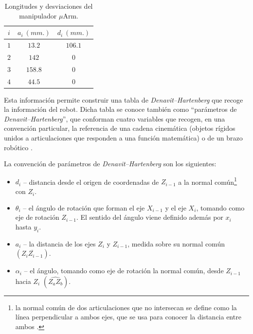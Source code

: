 \begin{table}[ht]
\begin{minipage}{.49\linewidth}
\begin{tabular}{|| c | c c ||}
            $i$ & $a_i~(mm.)$ & $d_i~(mm.)$ \\ [0.5ex]
            \hline\hline
            $1$ & $13.2$      & $106.1$     \\
            \hline
            $2$ & $142$       & $0$         \\
            \hline
            $3$ & $158.8$     & $0$         \\
            \hline
            $4$ & $44.5$      & $0$         \\ [1ex]
            \hline
        \end{tabular}
        \caption{Longitudes y desviaciones del manipulador $\mu$Arm.}
        \label{tab:uArm-ld-values}
    \end{minipage}
\end{table}

Esta información permite construir una tabla de \textit{Denavit--Hartenberg} que
recoge la información del robot. Dicha tabla se conoce también como ``parámetros de
\textit{Denavit--Hartenberg}'', que conforman cuatro variables que recogen, en una
convención particular, la referencia de una cadena cinemática (objetos rígidos unidos
a articulaciones que responden a una función matemática) o de un brazo robótico \cite{DenavitHartenbergParameters2020}.

La convención de parámetros de \textit{Denavit--Hartenberg} son los siguientes:
\begin{itemize}
    \item $d_i$ -- distancia desde el origen de coordenadas de $Z_{i - 1}$ a la normal común\footnote{la normal
              común de dos articulaciones que no intersecan se define como la línea perpendicular a
              ambos ejes, que se usa para conocer la distancia entre ambos \cite{CommonNormalRobotics2017}.}
          con $Z_i$.
    \item $\theta_i$ -- el ángulo de rotación que forman el eje $X_{i - 1}$ y el eje $X_i$,
                    tomando como eje de rotación $Z_{i - 1}$. El sentido del ángulo viene definido además
                    por $x_i$ hasta $y_i$.
    \item $a_i$ -- la distancia de los ejes $Z_i$ y $Z_{i - 1}$, medida sobre su normal común $\left(\overline{Z_iZ_{i-1}}\right)$.
    \item $\alpha_i$ -- el ángulo, tomando como eje de rotación la normal común, desde $Z_{i - 1}$ hacia $Z_i$ $\left(\widehat{Z_aZ_b}\right)$.
\end{itemize}

